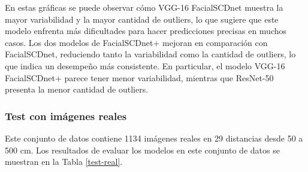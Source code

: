 En estas gráficas se puede observar cómo VGG-16 FacialSCDnet muestra la mayor variabilidad y la mayor cantidad de outliers, lo que sugiere que este modelo enfrenta más dificultades para hacer predicciones precisas en muchos casos. Los dos modelos de FacialSCDnet+ mejoran en comparación con FacialSCDnet, reduciendo tanto la variabilidad como la cantidad de outliers, lo que indica un desempeño más consistente. En particular, el modelo VGG-16 FacialSCDnet+ parece tener menor variabilidad, mientras que ResNet-50 presenta la menor cantidad de outliers.

\subsubsection{Test con imágenes reales}

Este conjunto de datos contiene 1134 imágenes reales en 29 distancias desde 50 a 500 cm. Los resultados de evaluar los modelos en este conjunto de datos se muestran en la Tabla \ref{test-real}.

